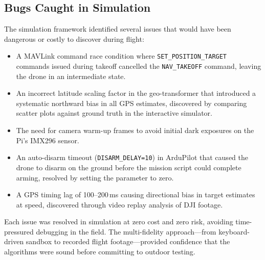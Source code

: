 \subsection{Bugs Caught in Simulation}\label{sec:sim-bugs}

The simulation framework identified several issues that would have been dangerous or costly to discover during flight:

\begin{itemize}
    \item A MAVLink command race condition where \texttt{SET\_POSITION\_TARGET} commands issued during takeoff cancelled the \texttt{NAV\_TAKEOFF} command, leaving the drone in an intermediate state.
    \item An incorrect latitude scaling factor in the geo-transformer that introduced a systematic northward bias in all GPS estimates, discovered by comparing scatter plots against ground truth in the interactive simulator.
    \item The need for camera warm-up frames to avoid initial dark exposures on the Pi's IMX296 sensor.
    \item An auto-disarm timeout (\texttt{DISARM\_DELAY=10}) in ArduPilot that caused the drone to disarm on the ground before the mission script could complete arming, resolved by setting the parameter to zero.
    \item A GPS timing lag of 100--200\,ms causing directional bias in target estimates at speed, discovered through video replay analysis of DJI footage.
\end{itemize}

Each issue was resolved in simulation at zero cost and zero risk, avoiding time-pressured debugging in the field. The multi-fidelity approach---from keyboard-driven sandbox to recorded flight footage---provided confidence that the algorithms were sound before committing to outdoor testing.
